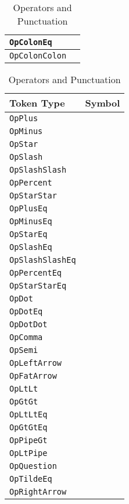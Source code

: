 \begin{table}[h]
{\begin{tabular}[t]{ll}
        \texttt{OpColonEq} & \op{:=} \\
        \hline
        \texttt{OpColonColon} & \op{::} \\
        \hline
    \end{tabular}
}
\hfill
\parbox[t]{0.45\linewidth}{
    \centering
    \begin{tabular}[t]{ll}
        \hline
        \textbf{Token Type} & \textbf{Symbol} \\
        \hline
        \texttt{OpPlus} & \op{+} \\
        \texttt{OpMinus} & \op{-} \\
        \texttt{OpStar} & \op{*} \\
        \texttt{OpSlash} & \op{/} \\
        \texttt{OpSlashSlash} & \op{//} \\
        \texttt{OpPercent} & \op{\%} \\
        \texttt{OpStarStar} & \op{**} \\
        \hline
        \texttt{OpPlusEq} & \op{+=} \\
        \texttt{OpMinusEq} & \op{-=} \\
        \texttt{OpStarEq} & \op{*=} \\
        \texttt{OpSlashEq} & \op{/=} \\
        \texttt{OpSlashSlashEq} & \op{//=} \\
        \texttt{OpPercentEq} & \op{\%=} \\
        \texttt{OpStarStarEq} & \op{**=} \\
        \hline
        \texttt{OpDot} & \op{.} \\
        \texttt{OpDotEq} & \op{.=} \\
        \texttt{OpDotDot} & \op{..} \\
        \texttt{OpComma} & \op{,} \\
        \texttt{OpSemi} & \op{;} \\
        \texttt{OpLeftArrow} & \op{<-} \\
        \texttt{OpFatArrow} & \op{=>} \\
        \hline
        \texttt{OpLtLt} & \op{<<} \\
        \texttt{OpGtGt} & \op{>>} \\
        \texttt{OpLtLtEq} & \op{<<=} \\
        \texttt{OpGtGtEq} & \op{>>=} \\
        \texttt{OpPipeGt} & \op{|>} \\
        \texttt{OpLtPipe} & \op{<|} \\
        \hline
        \texttt{OpQuestion} & \op{?} \\
        \texttt{OpTildeEq} & \op{\textasciitilde=} \\
        \texttt{OpRightArrow} & \op{->} \\
        \hline
    \end{tabular}
}
\caption{\label{tab:operators}Operators and Punctuation}
\end{table}

